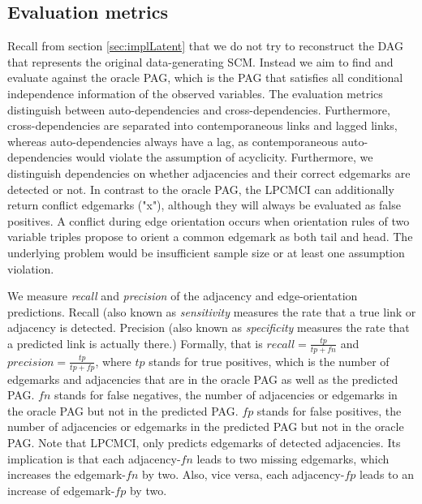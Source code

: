 \documentclass[conference]{IEEEtran}
\begin{document}
\subsection{Evaluation metrics}
\label{sec:eval}
Recall from section \ref{sec:implLatent} that we do not try to reconstruct the DAG that represents the original data-generating SCM. Instead we aim to find and evaluate against the oracle PAG, which is the PAG that satisfies all conditional independence information of the observed variables. 
The evaluation metrics distinguish between auto-dependencies and cross-dependencies. 
Furthermore, cross-dependencies are separated into contemporaneous links and lagged links, whereas auto-dependencies always have a lag, as contemporaneous auto-dependencies would violate the assumption of acyclicity.
Furthermore, we distinguish dependencies on whether adjacencies and their correct edgemarks are detected or not. In contrast to the oracle PAG, the LPCMCI can additionally return conflict edgemarks ("x"), although they will always be evaluated as false positives.
A conflict during edge orientation occurs when orientation rules of two variable triples propose to orient a common edgemark as both tail and head\cite{runge_pcmci_2020}. The underlying problem would be insufficient sample size or at least one assumption violation\cite{runge_tigramite_2022}.

We measure \textit{recall} and \textit{precision} of the adjacency and edge-orientation predictions. Recall (also known as \textit{sensitivity} measures the rate that a true link or adjacency is detected. Precision (also known as \textit{specificity} measures the rate that a predicted link is actually there.) Formally, that is $recall = \frac{tp}{tp+fn}$ and $precision = \frac{tp}{tp+fp}$, where
$tp$ stands for true positives, which is the number of edgemarks and adjacencies that are in the oracle PAG as well as the predicted PAG.
$fn$ stands for false negatives,  the number of adjacencies or edgemarks in the oracle PAG but not in the predicted PAG.
$fp$ stands for false positives, the number of adjacencies or edgemarks in the predicted PAG but not in the oracle PAG.
Note that LPCMCI, only predicts edgemarks of detected adjacencies. Its implication is that each adjacency-$fn$ leads to two missing edgemarks, which increases the edgemark-$fn$ by two.
Also, vice versa, each adjacency-$fp$ leads to an increase of edgemark-$fp$ by two.
\end{document}
